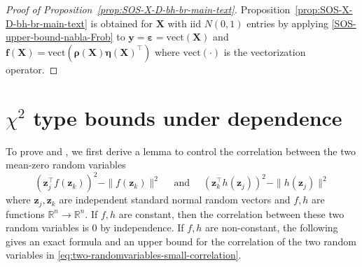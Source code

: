 \documentclass[11pt]{amsart}
\numberwithin{equation}{section}
\numberwithin{equation}{section}
\def\real{{\mathbb{R}}}
\def\R{{\real}}
\def\mathbold{\boldsymbol} %
\def\bX{\mathbold{X}}\def\hbX{{\widehat{\bX}}}\def\tbX{{\widetilde{\bX}}}\def\bXbar{{\overline \bX}}
\def\by{\mathbold{y}}\def\yhat{\widehat{y}}\def\ytil{\widetilde{y}}\def\ybar{{\overline y}}\def\vby{{\bf y}}
\def\bz{\mathbold{z}}\def\zhat{\widehat{z}}\def\ztil{\widetilde{z}}\def\zbar{{\overline z}}
\def\ep{\varepsilon}\def\eps{\epsilon}\def\veps{\varepsilon}
\def\bep{ {\mathbold{\ep} }}
\def\bfeta{\mathbold{\eta}}\def\etahat{\widehat{\eta}}\def\heta{\widehat{\eta}}
\def\brho{\mathbold{\rho}}\def\rhohat{\widehat{\rho}}\def\hrho{\widehat{\rho}}
\newcommand\pb[1]{{ #1 }}
\begin{document}
\begin{proof}[Proof of Proposition~\ref{prop:SOS-X-D-bh-br-main-text}]
Proposition~\ref{prop:SOS-X-D-bh-br-main-text} is 
obtained for $\bX$ with iid $N(0,1)$
entries by applying
\eqref{SOS-upper-bound-nabla-Frob}
to $\by=\bep=\text{vect}(\bX)$
and $\mathbf f(\bX)=\text{vect}(\brho(\bX)\bfeta(\bX)^\top)$ where
$\text{vect}(\cdot)$ is the 
vectorization operator.
\end{proof}



\section{$\chi^2$ type bounds under dependence}
\label{sec:proof_chi2}
To prove 
and , we first derive a lemma
to control the correlation between
the two mean-zero random variables 
\begin{equation}
    (\bz_j^{\pb{\top}} f(\bz_k))^2-\|f (\bz_k)\|^2
\quad \text{ and } \quad
(\bz_k^{\pb{\top}} h(\bz_j))^2-\|h (\bz_j)\|^2
\label{eq:two-randomvariables-small-correlation}
\end{equation}
where $\bz_j,\bz_k$ are independent standard normal random vectors
and $f,h$ are functions $\R^n\to\R^n$.
If $f,h$ are constant, then
the correlation between these two random variables is 0 by independence.
If $f,h$ are non-constant, the following gives an exact
formula and an upper bound for the correlation
of the two random variables in 
\eqref{eq:two-randomvariables-small-correlation}.
\end{document}
